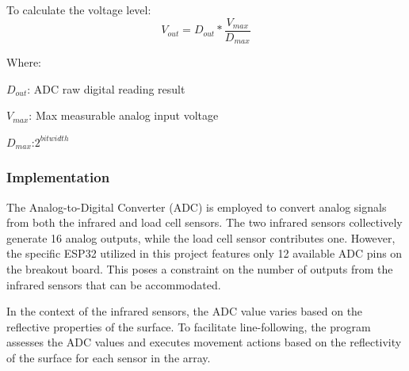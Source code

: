 \documentclass[../report.tex]{subfiles}
\begin{document}
    To calculate the voltage level:
    \begin{equation}
        V_{out}=D_{out}*\dfrac{V_{max}}{D_{max}}
    \end{equation}
    
    Where:

    $D_{out}$: ADC raw digital reading result

    $V_{max}$: Max measurable analog input voltage 

    $D_{max}$:$2^{bitwidth}$

    \subsubsection{Implementation}
    The Analog-to-Digital Converter (ADC) is employed to convert analog signals
    from both the infrared and load cell sensors. The two infrared sensors
    collectively generate 16 analog outputs, while the load cell sensor
    contributes one. However, the specific ESP32 utilized in this project
    features only 12 available ADC pins on the breakout board. This poses a
    constraint on the number of outputs from the infrared sensors that can be
    accommodated.

    In the context of the infrared sensors, the ADC value varies based on the
    reflective properties of the surface. To facilitate line-following, the
    program assesses the ADC values and executes movement actions based on the
    reflectivity of the surface for each sensor in the array.
\end{document}
